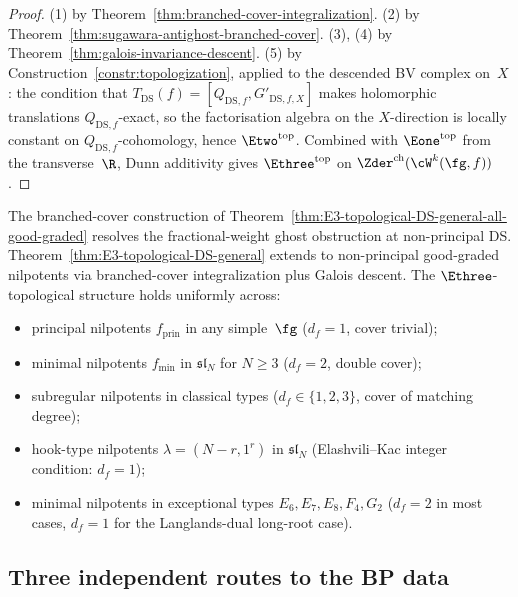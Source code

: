 \begin{proof}
(1) by Theorem~\ref{thm:branched-cover-integralization}.
(2) by Theorem~\ref{thm:sugawara-antighost-branched-cover}.
(3), (4) by Theorem~\ref{thm:galois-invariance-descent}.
(5) by Construction~\ref{constr:topologization}, applied to the
descended BV complex on~$X$: the condition that
$T_{\mathrm{DS}}(f) = [Q_{\mathrm{DS},f}, G'_{\mathrm{DS},f, X}]$
makes holomorphic translations \(Q_{\mathrm{DS},f}\)-exact, so the
factorisation algebra on the $X$-direction is locally constant on
$Q_{\mathrm{DS},f}$-cohomology, hence $\Etwo^{\mathrm{top}}$. Combined
with $\Eone^{\mathrm{top}}$ from the transverse~$\R$, Dunn
additivity gives $\Ethree^{\mathrm{top}}$ on
$\Zder^{\mathrm{ch}}(\cW^{k}(\fg, f))$.
\end{proof}

\begin{corollary}
\label{cor:fractional-ghost-healed-non-principal}
\ClaimStatusProvedHere{}

The branched-cover construction of
Theorem~\ref{thm:E3-topological-DS-general-all-good-graded} resolves
the fractional-weight ghost obstruction at non-principal DS.
Theorem~\ref{thm:E3-topological-DS-general} extends to non-principal
good-graded nilpotents via branched-cover integralization plus Galois
descent. The $\Ethree$-topological structure holds uniformly across:
\begin{itemize}[nosep]
\item principal nilpotents $f_{\mathrm{prin}}$ in any simple~$\fg$
 \textup{(}$d_{f} = 1$, cover trivial\textup{)};
\item minimal nilpotents $f_{\min}$ in $\mathfrak{sl}_{N}$ for
 $N \ge 3$ \textup{(}$d_{f} = 2$, double cover\textup{)};
\item subregular nilpotents in classical types
 \textup{(}$d_{f} \in \{1, 2, 3\}$, cover of matching
 degree\textup{)};
\item hook-type nilpotents $\lambda = (N{-}r, 1^{r})$ in
 $\mathfrak{sl}_{N}$ \textup{(}Elashvili--Kac integer
 condition: $d_{f} = 1$\textup{)};
\item minimal nilpotents in exceptional types $E_{6}, E_{7}, E_{8},
 F_{4}, G_{2}$ \textup{(}$d_{f} = 2$ in most cases, $d_{f} = 1$
 for the Langlands-dual long-root case\textup{)}.
\end{itemize}
\end{corollary}

\subsection{Three independent routes to the BP data}
\label{subsec:three-lane}

